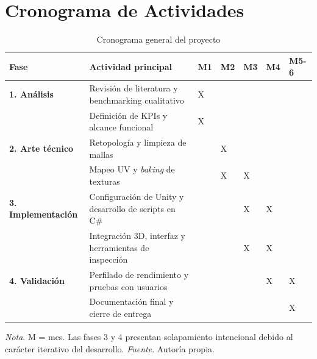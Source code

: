 \section{Cronograma de Actividades}

\begin{table}[H]
\caption{Cronograma general del proyecto}
\centering
\footnotesize
\setlength{\tabcolsep}{4pt}
\begin{tabularx}{\textwidth}{>{\RaggedRight\arraybackslash}p{2.6cm}>{\RaggedRight\arraybackslash}X>{\centering\arraybackslash}p{1cm}>{\centering\arraybackslash}p{1cm}>{\centering\arraybackslash}p{1cm}>{\centering\arraybackslash}p{1cm}>{\centering\arraybackslash}p{1.3cm}}
\hline
\textbf{Fase} & \textbf{Actividad principal} & \textbf{M1} & \textbf{M2} & \textbf{M3} & \textbf{M4} & \textbf{M5-6} \\ \hline
\textbf{1. An\'alisis} & Revisi\'on de literatura y benchmarking cualitativo & X & & & & \\
& Definici\'on de KPIs y alcance funcional & X & & & & \\
\textbf{2. Arte t\'ecnico} & Retopolog\'ia y limpieza de mallas & & X & & & \\
& Mapeo UV y \textit{baking} de texturas & & X & X & & \\
\textbf{3. Implementaci\'on} & Configuraci\'on de Unity y desarrollo de scripts en C\# & & & X & X & \\
& Integraci\'on 3D, interfaz y herramientas de inspecci\'on & & & X & X & \\
\textbf{4. Validaci\'on} & Perfilado de rendimiento y pruebas con usuarios & & & & X & X \\
& Documentaci\'on final y cierre de entrega & & & & & X \\ \hline
\end{tabularx}
\normalsize
\setlength{\tabcolsep}{6pt}
\par\vspace{0.5\baselineskip}
\textit{Nota}. M = mes. Las fases 3 y 4 presentan solapamiento intencional debido al car\'acter iterativo del desarrollo. \textit{Fuente}. Autor\'ia propia.
\end{table}

\newpage
